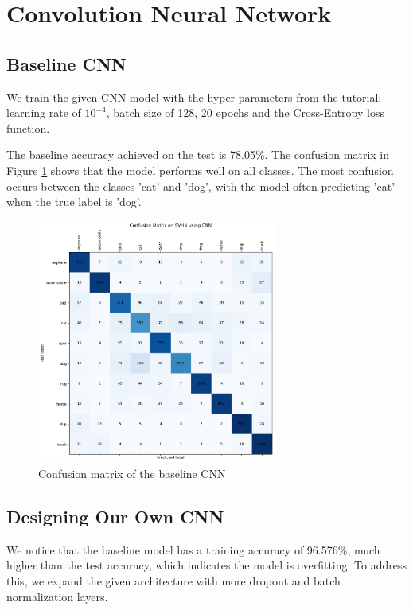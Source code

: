 \documentclass{article}
\begin{document}
\newpage

\section{Convolution Neural Network}

\subsection{Baseline CNN}
We train the given CNN model with the hyper-parameters from the tutorial: learning rate of $10^{-4}$, batch size of 128, 20 epochs and the Cross-Entropy loss function.

The baseline accuracy achieved on the test is 78.05\%. The confusion matrix in Figure \ref{fig:baseline_confusion_matrix} shows that the model performs well on all classes. The most confusion occurs between the classes 'cat' and 'dog', with the model often predicting 'cat' when the true label is 'dog'. 
\begin{figure}[h!]
    \centering
    \includegraphics[width=0.7\textwidth]{figs/2.1_cm.png}
    \caption{Confusion matrix of the baseline CNN}
    \label{fig:baseline_confusion_matrix}
\end{figure}

\subsection{Designing Our Own CNN}
We notice that the baseline model has a training accuracy of 96.576\%, much higher than the test accuracy, which indicates the model is overfitting. To address this, we expand the given architecture with more dropout and batch normalization layers.
\end{document}
